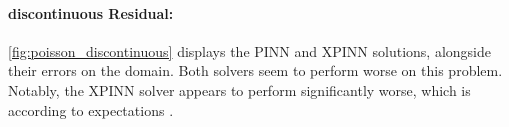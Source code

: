\paragraph{discontinuous Residual:}
\autoref{fig:poisson_discontinuous} displays the PINN and XPINN solutions, alongside their errors on the domain. Both solvers seem to perform worse on this problem. Notably, the XPINN solver appears to perform significantly worse, which is according to expectations \textcite{XPINN_generalize}.
\begin{figure}
\hfill
{}


\end{figure}
